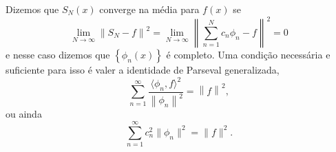 Dizemos que $S_N(x)$ converge na média para $f(x)$ se
\begin{dmath*}
  \lim_{N \to \infty} \left\| S_N - f \right\|^2 = \lim_{N \to \infty} \left\| \sum_{n =
  1}^N c_n \phi_n - f \right\|^2
  = 0
\end{dmath*}
e nesse caso dizemos que $\left\{ \phi_n(x) \right\}$ é completo. Uma condição
necessária e suficiente para isso é valer a identidade de Parseval generalizada,
\begin{dmath*}
  \sum_{n = 1}^\infty \frac{\langle \phi_n, f \rangle^2}{\left\| \phi_n \right\|^2} =
  \left\| f \right\|^2,
\end{dmath*}
ou ainda
\begin{dmath*}
  \sum_{n = 1}^\infty c_n^2 \| \phi_n \|^2 = \| f \|^2.
\end{dmath*}

